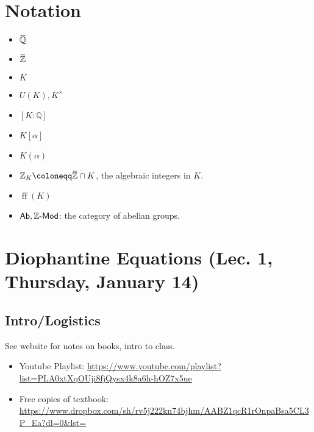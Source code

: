 \newpage

\tableofcontents
\newpage

\hypertarget{notation}{%
\section{Notation}\label{notation}}


\begin{itemize}
\tightlist
\item
  \(\mkern 1.5mu\overline{\mkern-1.5mu{\mathbb{Q}}\mkern-1.5mu}\mkern 1.5mu\)
\item
  \(\mkern 1.5mu\overline{\mkern-1.5mu{\mathbb{Z}}\mkern-1.5mu}\mkern 1.5mu\)
\item
  \(K\)
\item
  \(U(K), K^{\times}\)
\item
  \([K: {\mathbb{Q}}]\)
\item
  \(K[\alpha]\)
\item
  \(K(\alpha)\)
\item
  \({\mathbb{Z}}_K \coloneqq\mkern 1.5mu\overline{\mkern-1.5mu{\mathbb{Z}}\mkern-1.5mu}\mkern 1.5mu \cap K\),
  the algebraic integers in \(K\).
\item
  \(\operatorname{ff}(K)\)
\item
  \({\mathsf{Ab}}, \mathsf{{\mathbb{Z}}}{\hbox{-}}\mathsf{Mod}\): the
  category of abelian groups.
\end{itemize}

\hypertarget{diophantine-equations-lec.-1-thursday-january-14}{%
\section{Diophantine Equations (Lec. 1, Thursday, January
14)}\label{diophantine-equations-lec.-1-thursday-january-14}}

\hypertarget{intrologistics}{%
\subsection{Intro/Logistics}\label{intrologistics}}

See website for notes on books, intro to class.

\begin{itemize}
\item
  Youtube Playlist:
  \url{https://www.youtube.com/playlist?list=PLA0xtXqOUji8fjQysx4k8a6h-hOZ7x5ue}
\item
  Free copies of textbook:
  \url{https://www.dropbox.com/sh/rv5j222kn74bjhm/AABZ1qcR1rOnpaBsa5CL3P_Ea?dl=0\&lst=}
\end{itemize}

